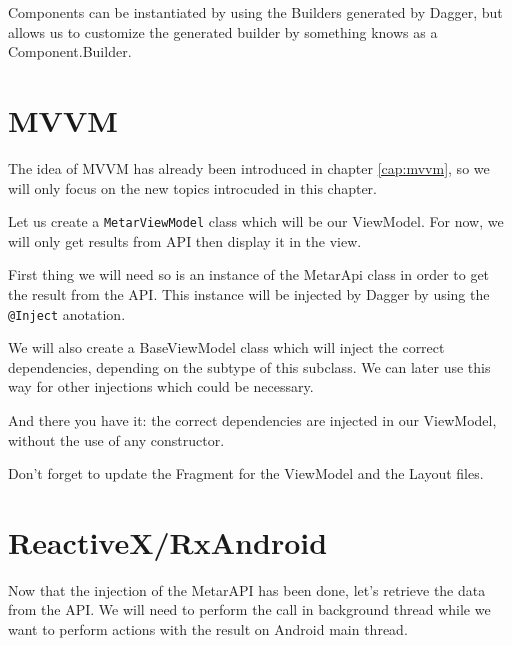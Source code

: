Components can be instantiated by using the Builders generated by Dagger, but  allows us to customize the generated builder by something knows as a Component.Builder. 




\section{MVVM}
The idea of MVVM has already been introduced in chapter \ref{cap:mvvm}, so we will only focus on the new topics introcuded in this chapter. 

Let us create a \lstinline!MetarViewModel! class which will be our ViewModel. For now, we will only get results from API then display it in the view.

First thing we will need so is an instance of the MetarApi class in order to get the result from the API. This instance will be injected by Dagger by using the \lstinline!@Inject! anotation.




We will also create a BaseViewModel class which will inject the correct dependencies, depending on the subtype of this subclass. We can later use this way for other injections which could be necessary.





And there you have it: the correct dependencies are injected in our ViewModel, without the use of any constructor. 

Don't forget to update the Fragment for the ViewModel and the Layout files. 


\section{ReactiveX/RxAndroid}
Now that the injection of the MetarAPI has been done, let’s retrieve the data from the API. We will need to perform the call in background thread while we want to perform actions with the result on Android main thread. 

